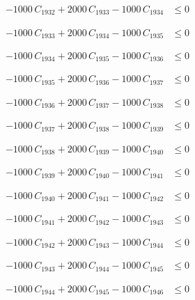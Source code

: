 \documentclass[a4paper,11pt]{article}
\begin{document}
\begin{align}
-1000\,C_{1932} + 2000\,C_{1933} - 1000\,C_{1934} &\leq 0 \nonumber
\end{align}

\begin{align}
-1000\,C_{1933} + 2000\,C_{1934} - 1000\,C_{1935} &\leq 0 \nonumber
\end{align}

\begin{align}
-1000\,C_{1934} + 2000\,C_{1935} - 1000\,C_{1936} &\leq 0 \nonumber
\end{align}

\begin{align}
-1000\,C_{1935} + 2000\,C_{1936} - 1000\,C_{1937} &\leq 0 \nonumber
\end{align}

\begin{align}
-1000\,C_{1936} + 2000\,C_{1937} - 1000\,C_{1938} &\leq 0 \nonumber
\end{align}

\begin{align}
-1000\,C_{1937} + 2000\,C_{1938} - 1000\,C_{1939} &\leq 0 \nonumber
\end{align}

\begin{align}
-1000\,C_{1938} + 2000\,C_{1939} - 1000\,C_{1940} &\leq 0 \nonumber
\end{align}

\begin{align}
-1000\,C_{1939} + 2000\,C_{1940} - 1000\,C_{1941} &\leq 0 \nonumber
\end{align}

\begin{align}
-1000\,C_{1940} + 2000\,C_{1941} - 1000\,C_{1942} &\leq 0 \nonumber
\end{align}

\begin{align}
-1000\,C_{1941} + 2000\,C_{1942} - 1000\,C_{1943} &\leq 0 \nonumber
\end{align}

\begin{align}
-1000\,C_{1942} + 2000\,C_{1943} - 1000\,C_{1944} &\leq 0 \nonumber
\end{align}

\begin{align}
-1000\,C_{1943} + 2000\,C_{1944} - 1000\,C_{1945} &\leq 0 \nonumber
\end{align}

\begin{align}
-1000\,C_{1944} + 2000\,C_{1945} - 1000\,C_{1946} &\leq 0 \nonumber
\end{align}
\end{document}
